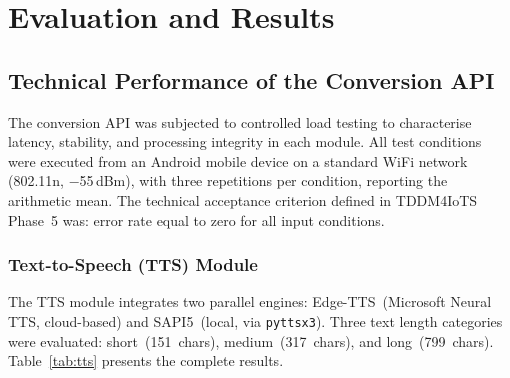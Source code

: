 \documentclass[journal]{IEEEtran}
\begin{document}
	\section{Evaluation and Results}
	\label{sec:evaluation}
	
	\subsection{Technical Performance of the Conversion API}
	The conversion API was subjected to controlled load testing to
	characterise latency, stability, and processing integrity in each
	module.
	All test conditions were executed from an Android mobile device
	on a standard WiFi network (802.11n, $-$55\,dBm), with three
	repetitions per condition, reporting the arithmetic mean.
	The technical acceptance criterion defined in TDDM4IoTS
	Phase~5 was: error rate equal to zero for all input conditions.
	
	\subsubsection{Text-to-Speech (TTS) Module}
	The TTS module integrates two parallel engines: Edge-TTS~(Microsoft
	Neural TTS, cloud-based) and SAPI5~(local, via \texttt{pyttsx3}).
	Three text length categories were evaluated: short~(151~chars),
	medium~(317~chars), and long~(799~chars).
	Table~\ref{tab:tts} presents the complete results.
	
\end{document}
